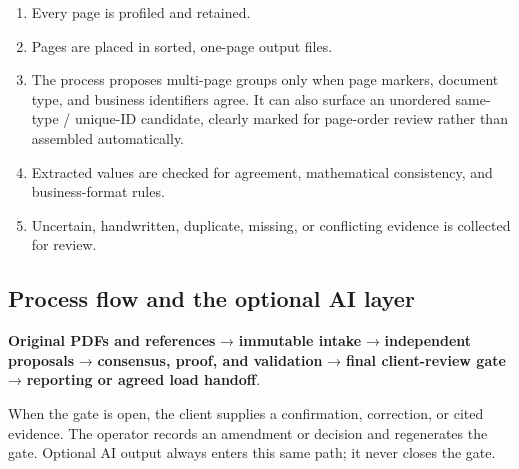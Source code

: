 \documentclass[
]{article}
\providecommand{\tightlist}{%
  \setlength{\itemsep}{0pt}\setlength{\parskip}{0pt}}
\begin{document}
\begin{enumerate}
\def\labelenumi{\arabic{enumi}.}
\tightlist
\item
  Every page is profiled and retained.
\item
  Pages are placed in sorted, one-page output files.
\item
  The process proposes multi-page groups only when page markers,
  document type, and business identifiers agree. It can also surface an
  unordered same-type / unique-ID candidate, clearly marked for
  page-order review rather than assembled automatically.
\item
  Extracted values are checked for agreement, mathematical consistency,
  and business-format rules.
\item
  Uncertain, handwritten, duplicate, missing, or conflicting evidence is
  collected for review.
\end{enumerate}

\subsection{Process flow and the optional AI
layer}\label{process-flow-and-the-optional-ai-layer}

\textbf{Original PDFs and references} → \textbf{immutable intake} →
\textbf{independent proposals} → \textbf{consensus, proof, and
validation} → \textbf{final client-review gate} → \textbf{reporting or
agreed load handoff}.

When the gate is open, the client supplies a confirmation, correction,
or cited evidence. The operator records an amendment or decision and
regenerates the gate. Optional AI output always enters this same path;
it never closes the gate.
\end{document}
